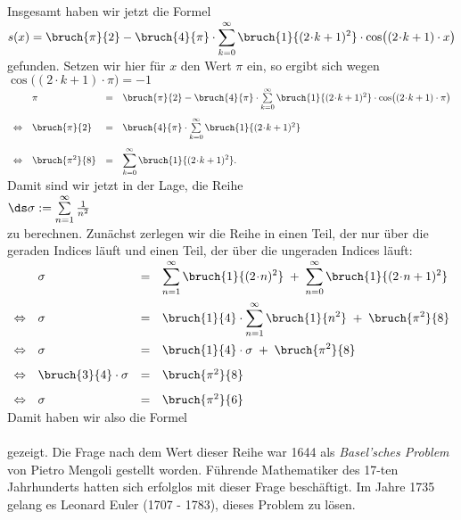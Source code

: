 Insgesamt haben wir jetzt die Formel 
\\[0.3cm]
\hspace*{1.3cm}
$\displaystyle s(x) = \bruch{\pi}{2} - \bruch{4}{\pi} \cdot\sum\limits_{k=0}^\infty \bruch{1}{(2\!\cdot\!k+1)^2} \cdot \cos\bigl((2\!\cdot\!k+1)\cdot x\bigr)$
\\[0.3cm]
gefunden.  Setzen wir hier f\"ur $x$ den Wert $\pi$ ein, so ergibt sich wegen $\cos\bigl((2\!\cdot\!k+1)\cdot \pi\bigr) = - 1$
\\[0.1cm]
\hspace*{1.3cm}
$
\begin{array}[t]{clcl}
                & \pi & = & \bruch{\pi}{2} - \bruch{4}{\pi} \cdot\sum\limits_{k=0}^\infty \bruch{1}{(2\!\cdot\!k+1)^2} \cdot \cos\bigl((2\!\cdot\!k+1)\cdot \pi\bigr) \\[0.5cm]
\Leftrightarrow & \bruch{\pi}{2} & = &  \bruch{4}{\pi} \cdot\sum\limits_{k=0}^\infty \bruch{1}{(2\!\cdot\!k+1)^2} \\[0.5cm]
\Leftrightarrow & \bruch{\pi^2}{8} & = & \displaystyle \sum\limits_{k=0}^\infty \bruch{1}{(2\!\cdot\!k+1)^2}.
\end{array}
$
\\[0.3cm]
Damit sind wir jetzt in der Lage, die Reihe 
\\[0.2cm]
\hspace*{1.3cm}
$\ds \sigma := \sum\limits_{n=1}^\infty \frac{1}{n^2}$
\\[0.2cm]
zu berechnen.  Zun\"achst zerlegen wir die Reihe in einen Teil, der nur \"uber die geraden Indices 
l\"auft und einen Teil, der \"uber die ungeraden Indices l\"auft: 
\\[0.3cm]
\hspace*{1.3cm}
$
\begin{array}[t]{clcl}
                & \sigma & = & \displaystyle 
                  \sum\limits_{n=1}^\infty \bruch{1}{(2\!\cdot\!n)^2} \;+\; \sum\limits_{n=0}^\infty \bruch{1}{(2\!\cdot\!n+1)^2} \\[0.5cm]
\Leftrightarrow & \sigma & = & \displaystyle 
                  \bruch{1}{4}\cdot\sum\limits_{n=1}^\infty \bruch{1}{n^2} \;+\; \bruch{\pi^2}{8} \\[0.5cm]
\Leftrightarrow & \sigma & = & \displaystyle \bruch{1}{4} \cdot \sigma  \;+\; \bruch{\pi^2}{8} \\[0.3cm]
\Leftrightarrow & \bruch{3}{4}\cdot\sigma & = & \bruch{\pi^2}{8} \\[0.3cm]
\Leftrightarrow & \sigma & = & \bruch{\pi^2}{6} 
\end{array}
$
\\[0.3cm]
Damit haben wir also die Formel 
\\[0.3cm]
\hspace*{1.3cm} \colorbox{red}{\colorbox{orange}{}}
\\[0.3cm]
gezeigt.  Die Frage nach dem Wert dieser Reihe war 1644 als \emph{Basel'sches Problem} von
Pietro Mengoli gestellt worden. 
F\"uhrende Mathematiker des 17-ten Jahrhunderts hatten sich erfolglos mit dieser Frage
besch\"aftigt.
Im Jahre 1735 gelang es Leonard Euler (1707 - 1783), dieses Problem zu l\"osen.

